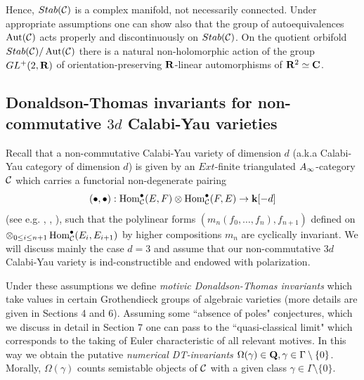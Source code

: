 \documentclass[12pt]{article}
\begin{document}
Hence, $Stab({\mathcal C})$ is a complex manifold, not necessarily connected.
Under appropriate assumptions one can show also that the group of autoequivalences $\operatorname{Aut}({\mathcal C})$ acts properly and discontinuously on $Stab({\mathcal C})$.
On the quotient orbifold $Stab({\mathcal C})/ \operatorname{Aut} ({\mathcal C})$ there is a natural non-holomorphic action of
the group $GL^+(2,{\bf R})$ of orientation-preserving ${\bf R}$-linear automorphisms of ${\bf R}^2\simeq {\bf C}$.



\subsection{Donaldson-Thomas invariants for non-commutative $3d$ Calabi-Yau varieties}

Recall that a non-commutative Calabi-Yau variety of dimension $d$ (a.k.a Calabi-Yau category
of dimension $d$) is given
by an $Ext$-finite triangulated $A_{\infty}$-category ${\cal C}$ which carries a functorial
non-degenerate pairing $$(\bullet, \bullet): \operatorname{Hom}^\bullet_{{\mathcal C}}(E,F)\otimes \operatorname{Hom}^\bullet_{{\mathcal C}}(F,E)\to {\bf k}[-d]$$
 (see e.g. \cite{KoSo3}, \cite{So1}, \cite{Laz}),
such that the polylinear forms $(m_n(f_0,\dots,f_n),f_{n+1})$ defined on
$\otimes_{0\le i\le n+1}\operatorname{Hom}^\bullet_{{\mathcal C}}(E_i,E_{i+1})$ by higher compositions $m_n$ are cyclically invariant.
We will discuss mainly the case $d=3$ and assume that our non-commutative $3d$ Calabi-Yau variety is ind-constructible and endowed with polarization.

Under these assumptions we define  {\it motivic Donaldson-Thomas invariants} which take values in certain Grothendieck groups of algebraic varieties (more details are given in Sections 4 and 6). Assuming some ``absence of poles" conjectures, which we discuss in detail in Section 7 one can pass to the ``quasi-classical limit" which corresponds to the taking of Euler characteristic of all relevant motives. In this way we obtain the putative {\it numerical DT-invariants} $\Omega(\gamma)\in {\bf Q}, \gamma\in \Gamma\setminus \{0\}$.
Morally, $\Omega(\gamma)$ counts semistable objects of ${\mathcal C}$ with a given class $\gamma\in \Gamma\setminus \{0\}$.
\end{document}
